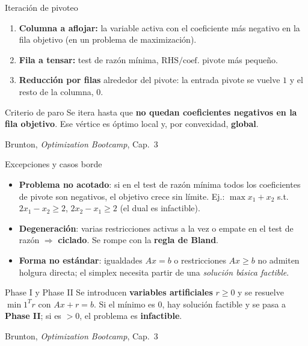 \documentclass[10pt,aspectratio=169]{beamer}
\newcommand{\fuente}{\vfill{\scriptsize\color{gray}Brunton, \emph{Optimization Bootcamp}, Cap.~3}}
\begin{document}
\begin{frame}{Iteración de pivoteo}
  \small
  \begin{enumerate}
    \item \textbf{Columna a aflojar:} la variable activa con el coeficiente más
      negativo en la fila objetivo (en un problema de maximización).
    \item \textbf{Fila a tensar:} test de razón mínima, $\mathrm{RHS}/\text{coef. pivote}$
      más pequeño.
    \item \textbf{Reducción por filas} alrededor del pivote: la entrada pivote se vuelve
      $1$ y el resto de la columna, $0$.
  \end{enumerate}
  \vfill
  \begin{block}{Criterio de paro}
    Se itera hasta que \textbf{no quedan coeficientes negativos en la fila objetivo}.
    Ese vértice es óptimo local y, por convexidad, \textbf{global}.
  \end{block}
  \fuente
\end{frame}


\begin{frame}{Excepciones y casos borde}
  \small
  \begin{itemize}
    \item \textbf{Problema no acotado}: si en el test de razón mínima todos los
      coeficientes de pivote son negativos, el objetivo crece sin límite.
      Ej.: $\max x_1+x_2$ s.t.\ $2x_1 - x_2 \ge 2$, $2x_2 - x_1 \ge 2$
      (el dual es infactible).
    \item \textbf{Degeneración}: varias restricciones activas a la vez o empate en el
      test de razón $\Rightarrow$ \textbf{ciclado}. Se rompe con la
      \textbf{regla de Bland}.
    \item \textbf{Forma no estándar}: igualdades $Ax = b$ o restricciones $Ax \ge b$
      no admiten holgura directa; el simplex necesita partir de una
      \emph{solución básica factible}.
  \end{itemize}
  \vfill
  \begin{alertblock}{Phase I y Phase II}
    Se introducen \textbf{variables artificiales} $r \ge 0$ y se resuelve
    $\min 1^T r$ con $Ax + r = b$. Si el mínimo es $0$, hay solución factible y se
    pasa a \textbf{Phase II}; si es $>0$, el problema es \textbf{infactible}.
  \end{alertblock}
  \fuente
\end{frame}

\end{document}
